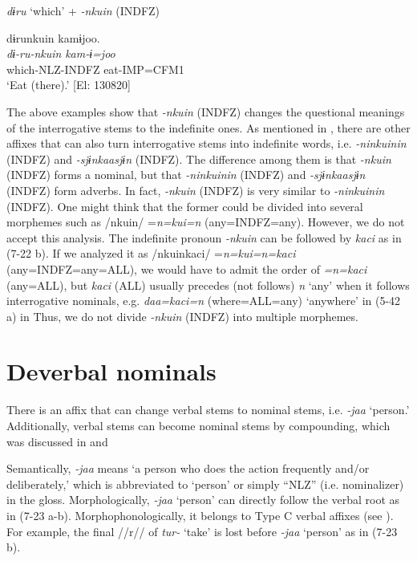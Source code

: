 \ex \label{ex:7:22e} \textit{dɨru} ‘which’ + \textit{{}-nkuin} (INDFZ)

\glll  dɨrunkuin  kamɨjoo.\\
\textit{dɨ-ru-nkuin}  \textit{kam-ɨ=joo}\\
which-NLZ-INDFZ  eat-IMP=CFM1\\
\glt ‘Eat  (there).’ [El: 130820]
\z
\z

The above examples show that \textit{{}-nkuin} (INDFZ) changes the questional meanings of the interrogative stems to the indefinite ones. As mentioned in , there are other affixes that can also turn interrogative stems into indefinite words, i.e. \textit{{}-ninkuinin} (INDFZ) and \textit{{}-sjɨnkaasjɨn} (INDFZ). The difference among them is that \textit{{}-nkuin} (INDFZ) forms a nominal, but that \textit{{}-ninkuinin} (INDFZ) and \textit{{}-sjɨnkaasjɨn} (INDFZ) form adverbs. In fact, \textit{{}-nkuin} (INDFZ) is very similar to \textit{{}-ninkuinin} (INDFZ). One might think that the former could be divided into several morphemes such as /nkuin/ =\textit{n=kui=n} (any=INDFZ=any). However, we do not accept this analysis. The indefinite pronoun \textit{{}-nkuin} can be followed by \textit{kaci} as in (7-22 b). If we analyzed it as /nkuinkaci/ =\textit{n=kui=n=kaci} (any=INDFZ=any=ALL), we would have to admit the order of \textit{=n=kaci} (any=ALL), but \textit{kaci} (ALL) usually precedes (not follows) \textit{n} ‘any’ when it follows interrogative nominals, e.g. \textit{daa=kaci=n} (where=ALL=any) ‘anywhere’ in (5-42 a) in  Thus, we do not divide \textit{{}-nkuin} (INDFZ) into multiple morphemes.

\section{Deverbal nominals}

There is an affix that can change verbal stems to nominal stems, i.e. \textit{{}-jaa} ‘person.’ Additionally, verbal stems can become nominal stems by compounding, which was discussed in  and 

Semantically, \textit{{}-jaa} means ‘a person who does the action frequently and/or deliberately,’ which is abbreviated to ‘person’ or simply “NLZ” (i.e. nominalizer) in the gloss. Morphologically, \textit{-jaa} ‘person’ can directly follow the verbal root as in (7-23 a-b). Morphophonologically, it belongs to Type C verbal affixes (see ). For example, the final //r// of \textit{tur-} ‘take’ is lost before \textit{{}-jaa} ‘person’ as in (7-23 b).

